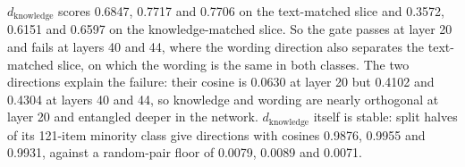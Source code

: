 $d_{\text{knowledge}}$ scores 0.6847, 0.7717 and 0.7706 on the text-matched slice and 0.3572, 0.6151 and 0.6597 on the knowledge-matched slice. %
So the gate passes at layer 20 and fails at layers 40 and 44, where the wording direction also separates the text-matched slice, on which the wording is the same in both classes. %
The two directions explain the failure: their cosine is 0.0630 at layer 20 but 0.4102 and 0.4304 at layers 40 and 44, so knowledge and wording are nearly orthogonal at layer 20 and entangled deeper in the network. %
$d_{\text{knowledge}}$ itself is stable: split halves of its 121-item minority class give directions with cosines 0.9876, 0.9955 and 0.9931, against a random-pair floor of 0.0079, 0.0089 and 0.0071. %

